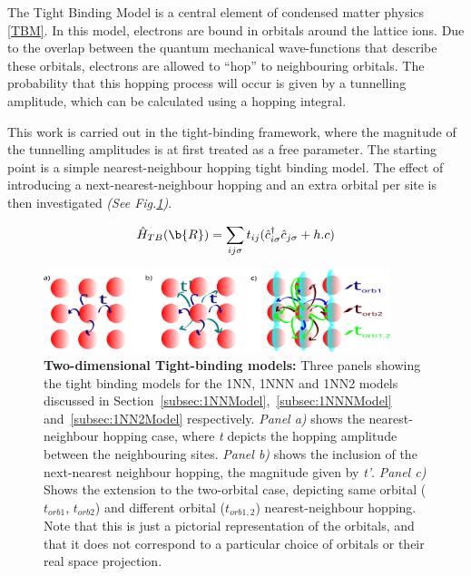 \documentclass[11pt]{article}
\begin{document}
The Tight Binding Model is a central element of condensed matter physics \eqref{TBM}. In this model, electrons are bound in orbitals around the lattice ions.
Due to the overlap between the quantum mechanical wave-functions that describe these orbitals, 
electrons are allowed to ``hop'' to neighbouring orbitals. The probability that this hopping process will 
occur is given by a tunnelling amplitude, which can be calculated using a hopping integral. \par
\medskip
\noindent This work is carried out in the tight-binding framework, where the magnitude of the tunnelling amplitudes is at first treated as a free parameter. 
The starting point is a simple nearest-neighbour hopping tight binding model. 
The effect of introducing a next-nearest-neighbour hopping and an extra orbital per site
is then investigated \textit{(See Fig.\ref{fig:2D Hubbard model})}.



\begin{equation} \label{TBM}
    \hat{H}_{TB}(\b{R}) = \sum_{ij\sigma} t_{ij}(\hat{c}_{i\sigma}^{\dagger}\hat{c}_{j \sigma} + h.c)
\end{equation}


\begin{figure}[htbp]  %
    \centering
    \includegraphics[width=0.9\textwidth]{2Dhubbardmodel.png}  %
    \caption{\textbf{Two-dimensional Tight-binding models:} Three panels showing the tight binding models for the 1NN, 1NNN and 1NN2 models discussed in Section~\ref{subsec:1NNModel},~\ref{subsec:1NNNModel} and~\ref{subsec:1NN2Model} respectively. \textit{Panel a)} shows the nearest-neighbour hopping case, where \textit{t} depicts the hopping amplitude between the neighbouring sites. \textit{Panel b)} shows the inclusion of the next-nearest neighbour hopping, the magnitude given by \textit{t'}.
    \textit{Panel c)} Shows the extension to the two-orbital case, depicting  same orbital ($t_{orb1}$, $t_{orb2}$) and different orbital ($t_{orb1,2}$) nearest-neighbour hopping. Note that this is just a pictorial representation of the orbitals, and that it does not correspond to a particular choice of orbitals or their real space projection. }
    \label{fig:2D Hubbard model}
\end{figure}
\end{document}
